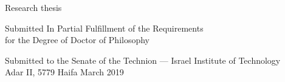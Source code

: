 \begin{adjustwidth}{-1cm}{-1cm}
\begin{center}



{\Large Research thesis}


\parbox{30em}{
\begin{center}
Submitted In Partial Fulfillment of the Requirements
\\
for the Degree of Doctor of Philosophy
\end{center}
}


{\large \author{}}


\parbox{32em}{
\begin{center}
Submitted to the Senate of the Technion --- Israel Institute of Technology
\\
Adar II, 5779 \hfill Haifa \hfill March 2019
\end{center}
}

\end{center}
\end{adjustwidth}
